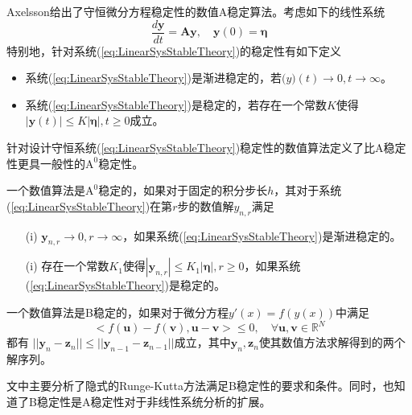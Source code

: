 Axelsson给出了守恒微分方程稳定性的数值A稳定算法\cite{Axelsson1969}。考虑如下的线性系统
\begin{equation}
\frac{d\bm{y}}{dt}=\bm{Ay},\quad \bm{y}(0)=\bm{\eta}\label{eq:LinearSysStableTheory}
\end{equation}
特别地，针对系统(\ref{eq:LinearSysStableTheory})的稳定性有如下定义
\begin{itemize}
\item 系统(\ref{eq:LinearSysStableTheory})是渐进稳定的，若$\bm(y)(t)\to0,t\to\infty$。
\item 系统(\ref{eq:LinearSysStableTheory})是稳定的，若存在一个常数$K$使得$|\bm{y}(t)|\le K|\bm{\eta}|,t\ge0$成立。
\end{itemize}
针对设计守恒系统(\ref{eq:LinearSysStableTheory})稳定性的数值算法定义了比A稳定性更具一般性的$\text{A}^0$稳定性。
\begin{definition}
一个数值算法是$\text{A}^0$稳定的\cite{Axelsson1969}，如果对于固定的积分步长$h$，其对于系统(\ref{eq:LinearSysStableTheory})在第$r$步的数值解$y_{n,r}$满足
\begin{itemize}
\item[(i)] $\bm{y}_{n,r}\to0,r\to\infty$，如果系统(\ref{eq:LinearSysStableTheory})是渐进稳定的。
\item[(i)] 存在一个常数$K_1$使得$|\bm{y}_{n,r}|\le K_1|\bm{\eta}|,r\ge0$，如果系统(\ref{eq:LinearSysStableTheory})是稳定的。
\end{itemize}
\end{definition}

\begin{definition}[B稳定性]
一个数值算法是B稳定的\cite{Butcher1975}，如果对于微分方程$y'(x)=f(y(x))$中满足
\begin{equation}
<f(\bm{u})-f(\bm{v}),\bm{u}-\bm{v}>\le0,\quad\forall\bm{u},\bm{v}\in\mathbb{R}^N
\end{equation}都有
$||\bm{y}_n-\bm{z}_n||\le ||\bm{y}_{n-1}-\bm{z}_{n-1}||$成立，其中$\bm{y}_n,\bm{z}_n$使其数值方法求解得到的两个解序列。
\end{definition}
文中主要分析了隐式的Runge-Kutta方法满足B稳定性的要求和条件。同时，也知道了B稳定性是A稳定性对于非线性系统分析的扩展。

